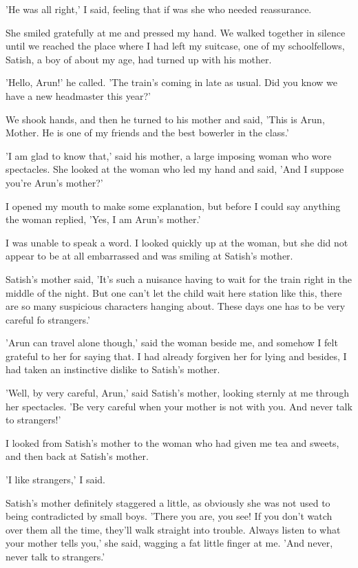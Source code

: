 \par
'He was all right,' I said, feeling that if was she who needed reassurance.
\par
She smiled gratefully at me and pressed my hand. We walked together in silence until we reached the place where I had left my suitcase, one of my schoolfellows, Satish, a boy of about my age, had turned up with his mother.
\par
'Hello, Arun!' he called. 'The train's coming in late as usual. Did you know we have a new headmaster this year?'
\par
We shook hands, and then he turned to his mother and said, 'This is Arun, Mother. He is one of my friends and the best bowerler in the class.'
\par
'I am glad to know that,' said his mother, a large imposing woman who wore spectacles. She looked at the woman who led my hand and said, 'And I suppose you're Arun's mother?'
\par
I opened my mouth to make some explanation, but before I could say anything the woman replied, 'Yes, I am Arun's mother.'
\par
I was unable to speak a word. I looked quickly up at the woman, but she did not appear to be at all embarrassed and was smiling at Satish's mother.
\par
Satish's mother said, 'It's such a nuisance having to wait for the train right in the middle of the night. But one can't let the child wait here station like this, there are so many suspicious characters hanging about. These days one has to be very careful fo strangers.'
\par
'Arun can travel alone though,' said the woman beside me, and somehow I felt grateful to her for saying that. I had already forgiven her for lying and besides, I had taken an instinctive dislike to Satish's mother.
\par
'Well, by very careful, Arun,' said Satish's mother, looking sternly at me through her spectacles. 'Be very careful when your mother is not with you. And never talk to strangers!'
\par
I looked from Satish's mother to the woman who had given me tea and sweets, and then back at Satish's mother.
\par
'I like strangers,' I said.
\par
Satish's mother definitely staggered a little, as obviously she was not used to being contradicted by small boys. 'There you are, you see! If you don't watch over them all the time, they'll walk straight into trouble. Always listen to what your mother tells you,' she said, wagging a fat little finger at me. 'And never, never talk to strangers.'
